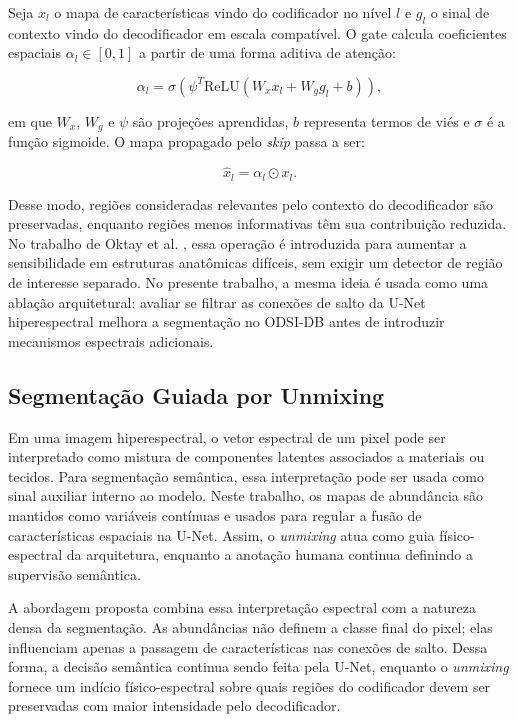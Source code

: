 \documentclass[conference]{IEEEtran}
\begin{document}
Seja $x_l$ o mapa de características vindo do codificador no nível $l$ e $g_l$
o sinal de contexto vindo do decodificador em escala compatível. O gate calcula
coeficientes espaciais $\alpha_l \in [0,1]$ a partir de uma forma aditiva de
atenção:

\[
\alpha_l =
\sigma\left(
\psi^{T}
\mathrm{ReLU}\left(W_x x_l + W_g g_l + b\right)
\right),
\]

em que $W_x$, $W_g$ e $\psi$ são projeções aprendidas, $b$ representa termos de
viés e $\sigma$ é a função sigmoide. O mapa propagado pelo \textit{skip} passa a
ser:

\[
\hat{x}_l = \alpha_l \odot x_l.
\]

Desse modo, regiões consideradas relevantes pelo contexto do decodificador são
preservadas, enquanto regiões menos informativas têm sua contribuição reduzida.
No trabalho de Oktay et al. \cite{oktay2018attentionunet}, essa operação é
introduzida para aumentar a sensibilidade em estruturas anatômicas difíceis,
sem exigir um detector de região de interesse separado. No presente trabalho, a
mesma ideia é usada como uma ablação arquitetural: avaliar se filtrar as
conexões de salto da U-Net hiperespectral melhora a segmentação no ODSI-DB
antes de introduzir mecanismos espectrais adicionais.

\subsection{Segmentação Guiada por Unmixing}

Em uma imagem hiperespectral, o vetor espectral de um pixel pode ser interpretado
como mistura de componentes latentes associados a materiais ou tecidos. Para
segmentação semântica, essa interpretação pode ser usada como sinal auxiliar
interno ao modelo. Neste trabalho, os mapas de abundância são mantidos como
variáveis contínuas e usados para regular a fusão de características espaciais
na U-Net. Assim, o \textit{unmixing} atua como guia físico-espectral da
arquitetura, enquanto a anotação humana continua definindo a supervisão
semântica.

A abordagem proposta combina essa interpretação espectral com a natureza densa
da segmentação. As abundâncias não definem a classe final do pixel; elas
influenciam apenas a passagem de características nas conexões de salto. Dessa
forma, a decisão semântica continua sendo feita pela U-Net, enquanto o
\textit{unmixing} fornece um indício físico-espectral sobre quais regiões do
codificador devem ser preservadas com maior intensidade pelo decodificador.
\end{document}
